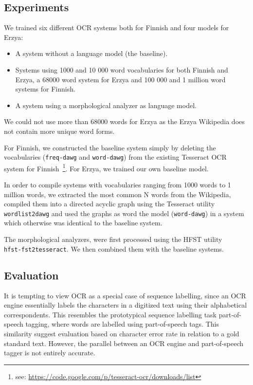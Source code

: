 \documentclass[b5paper]{article}
\begin{document}
\subsection{Experiments}
We trained six different OCR systems both for Finnish and four models for Erzya:
\begin{itemize}
\item A system without a language model (the baseline).
\item Systems using 1000 and 10 000 word vocabularies for both Finnish
  and Erzya, a 68000 word system for Erzya and 100 000 and 1 million
  word systems for Finnish.
\item A system using a morphological analyzer as language model.
\end{itemize}
We could not use more than 68000 words for Erzya as the Erzya
Wikipedia does not contain more unique word forms.

For Finnish, we constructed the baseline system simply by deleting the
vocabularies ({\tt freq-dawg} and {\tt word-dawg}) from the existing
Tesseract OCR system for Finnish~\footnote{see:
  \url{https://code.google.com/p/tesseract-ocr/downloads/list}}. For
Erzya, we trained our own baseline model.

In order to compile systems with vocabularies ranging from 1000 words
to 1 million words, we extracted the most common N words from the
Wikipedia, compiled them into a directed acyclic graph using the
Tesseract utility {\tt wordlist2dawg} and used the graphs as word the
model ({\tt word-dawg}) in a system which otherwise was identical to
the baseline system.

The morphological analyzers, were first processed using the HFST
utility\\{\tt hfst-fst2tesseract}. We then combined them with the
baseline systems.

\subsection{Evaluation}
It is tempting to view OCR as a special case of sequence labelling,
since an OCR engine essentially labels the characters in a digitized
text using their alphabetical correspondents. This resembles the
prototypical sequence labelling task part-of-speech tagging, where
words are labelled using part-of-speech tags. This similarity suggest
evaluation based on character error rate in relation to a gold
standard text. However, the parallel between an OCR engine and
part-of-speech tagger is not entirely accurate.
\end{document}
